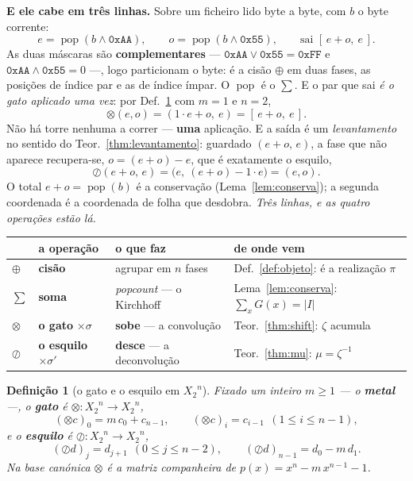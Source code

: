 \documentclass[11pt,a4paper]{article}
\newcommand{\abs}[1]{\lvert #1\rvert}
\newcommand{\Zc}{\ensuremath{X_2}}
\newtheorem{definicao}[teorema]{Definição}
\begin{document}
\medskip\noindent\textbf{E ele cabe em três linhas.} Sobre um ficheiro lido byte
a byte, com $b$ o byte corrente:
\[
\boxed{\;
e=\operatorname{pop}(b\wedge \mathtt{0xAA}),
\qquad
o=\operatorname{pop}(b\wedge \mathtt{0x55}),
\qquad
\text{sai } [\,e+o,\ e\,].
\;}
\]
As duas máscaras são \textbf{complementares} --- $\mathtt{0xAA}\vee\mathtt{0x55}
=\mathtt{0xFF}$ e $\mathtt{0xAA}\wedge\mathtt{0x55}=0$ ---, logo particionam o
byte: é a cisão $\oplus$ em duas fases, as posições de índice par e as de índice
ímpar. O $\operatorname{pop}$ é o $\sum$. E o par que sai \emph{é o gato aplicado
uma vez}: por Def.~\ref{def:gato} com $m=1$ e $n=2$,
\[
\otimes(e,o)=(1\cdot e+o,\ e)=[\,e+o,\ e\,].
\]
Não há torre nenhuma a correr --- \textbf{uma} aplicação. E a saída é um
\emph{levantamento} no sentido do Teor.~\ref{thm:levantamento}: guardado
$(e+o,\,e)$, a fase que não aparece recupera-se, $o=(e+o)-e$, que é exatamente o
esquilo,
\[
\oslash(e+o,\,e)=\bigl(e,\ (e+o)-1\cdot e\bigr)=(e,o).
\]
O total $e+o=\operatorname{pop}(b)$ é a conservação (Lema~\ref{lem:conserva}); a
segunda coordenada é a coordenada de folha que desdobra. \emph{Três linhas, e as
quatro operações estão lá.}

\begin{center}\small
\begin{tabular}{@{}llll@{}}
\toprule
 & a operação & o que faz & de onde vem \\
\midrule
$\oplus$ & \textbf{cisão} & agrupar em $n$ fases & Def.~\ref{def:objeto}: é a realização $\pi$ \\
$\sum$ & \textbf{soma} & \emph{popcount} --- o Kirchhoff & Lema~\ref{lem:conserva}: $\sum_x G(x)=\abs{I}$ \\
$\otimes$ & \textbf{o gato} $\times\sigma$ & \textbf{sobe} --- a convolução & Teor.~\ref{thm:shift}: $\zeta$ acumula \\
$\oslash$ & \textbf{o esquilo} $\times\sigma'$ & \textbf{desce} --- a deconvolução & Teor.~\ref{thm:mu}: $\mu=\zeta^{-1}$ \\
\bottomrule
\end{tabular}
\end{center}

\begin{definicao}[o gato e o esquilo em $\Zc^{n}$]\label{def:gato}
Fixado um inteiro $m\ge1$ --- o \textbf{metal} ---, o \textbf{gato} é
$\otimes\colon\Zc^{n}\to\Zc^{n}$,
\[
(\otimes c)_0=m\,c_0+c_{n-1},\qquad (\otimes c)_i=c_{i-1}\ \ (1\le i\le n-1),
\]
e o \textbf{esquilo} é $\oslash\colon\Zc^{n}\to\Zc^{n}$,
\[
(\oslash d)_j=d_{j+1}\ \ (0\le j\le n-2),\qquad
(\oslash d)_{n-1}=d_0-m\,d_1 .
\]
Na base canónica $\otimes$ é a matriz \emph{companheira} de
$p(x)=x^{n}-m\,x^{n-1}-1$.
\end{definicao}
\end{document}
